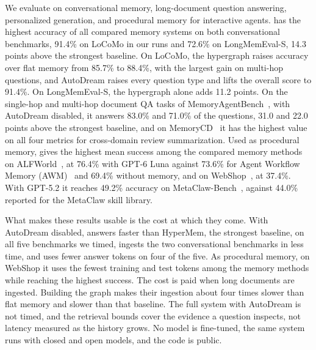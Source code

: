 We evaluate \ours on conversational memory, long-document question answering,
personalized generation, and procedural memory for interactive agents. \ours
has the highest accuracy of all compared memory systems on both conversational
benchmarks, 91.4\% on LoCoMo in our runs and 72.6\% on LongMemEval-S, 14.3 points
above the strongest baseline. On LoCoMo, the hypergraph raises accuracy over flat
memory from 85.7\% to 88.4\%, with the largest gain on multi-hop questions, and
AutoDream raises every question type and lifts the overall score to 91.4\%. On
LongMemEval-S, the hypergraph alone adds 11.2 points. On the single-hop and multi-hop document QA tasks of
MemoryAgentBench~\citep{memoryagentbench}, with AutoDream disabled, it answers
83.0\% and 71.0\% of the questions, 31.0 and 22.0 points above the strongest
baseline, and on MemoryCD~\citep{memorycd} it has the highest value on all four
metrics for cross-domain review summarization. Used as procedural memory, \ours
gives the highest mean success among the compared memory methods on
ALFWorld~\citep{shridhar2021alfworld}, at 76.4\% with GPT-6 Luna against 73.6\%
for Agent Workflow Memory (AWM)~\citep{wang2025awm} and 69.4\% without memory, and on WebShop~\citep{yao2022webshop}, at
37.4\%. With GPT-5.2 it reaches 49.2\% accuracy on
MetaClaw-Bench~\citep{xia2026metaclaw}, against 44.0\% reported for the MetaClaw
skill library.

What makes these results usable is the cost at which they come. With AutoDream
disabled, \ours answers faster than HyperMem, the strongest baseline, on all five
benchmarks we timed, ingests the two conversational benchmarks in less time, and
uses fewer answer tokens on four of the five. As procedural memory, on WebShop it
uses the fewest training and test tokens among the memory methods while reaching
the highest success. The cost is paid when long documents are ingested. Building the graph makes
their ingestion about four times slower than flat memory and slower than that
baseline. The full system with AutoDream is not timed, and the retrieval bounds
cover the evidence a question inspects, not latency measured as the history
grows. No model is fine-tuned, the same system runs with closed and open
models, and the code is public.

